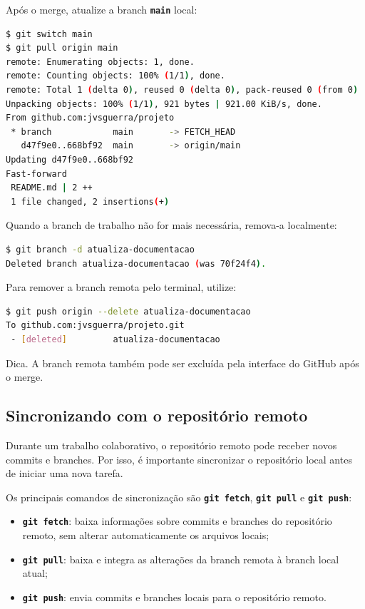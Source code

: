 \documentclass[12pt,a4paper]{article}
\begin{document}
Após o merge, atualize a branch \textbf{\texttt{main}} local: 

\begin{lstlisting}[language=bash]
$ git switch main
$ git pull origin main
remote: Enumerating objects: 1, done.
remote: Counting objects: 100% (1/1), done.
remote: Total 1 (delta 0), reused 0 (delta 0), pack-reused 0 (from 0)
Unpacking objects: 100% (1/1), 921 bytes | 921.00 KiB/s, done.
From github.com:jvsguerra/projeto
 * branch            main       -> FETCH_HEAD
   d47f9e0..668bf92  main       -> origin/main
Updating d47f9e0..668bf92
Fast-forward
 README.md | 2 ++
 1 file changed, 2 insertions(+)
\end{lstlisting}

Quando a branch de trabalho não for mais necessária, remova-a localmente:

\begin{lstlisting}[language=bash]
$ git branch -d atualiza-documentacao
Deleted branch atualiza-documentacao (was 70f24f4).
\end{lstlisting}

Para remover a branch remota pelo terminal, utilize:

\begin{lstlisting}[language=bash]
$ git push origin --delete atualiza-documentacao
To github.com:jvsguerra/projeto.git
 - [deleted]         atualiza-documentacao
\end{lstlisting}

\begin{question}{Dica.}
\footnotesize A branch remota também pode ser excluída pela interface do GitHub após o merge.
\end{question}

\subsection{Sincronizando com o repositório remoto}

Durante um trabalho colaborativo, o repositório remoto pode receber novos commits e branches. Por isso, é importante sincronizar o repositório local antes de iniciar uma nova tarefa. 

Os principais comandos de sincronização são \textbf{\texttt{git fetch}}, \textbf{\texttt{git pull}} e \textbf{\texttt{git push}}:

\begin{itemize}
  \item \textbf{\texttt{git fetch}}: baixa informações sobre commits e branches do repositório remoto, sem alterar automaticamente os arquivos locais;
  \item \textbf{\texttt{git pull}}: baixa e integra as alterações da branch remota à branch local atual; 
  \item \textbf{\texttt{git push}}: envia commits e branches locais para o repositório remoto. 
\end{itemize}
\end{document}
